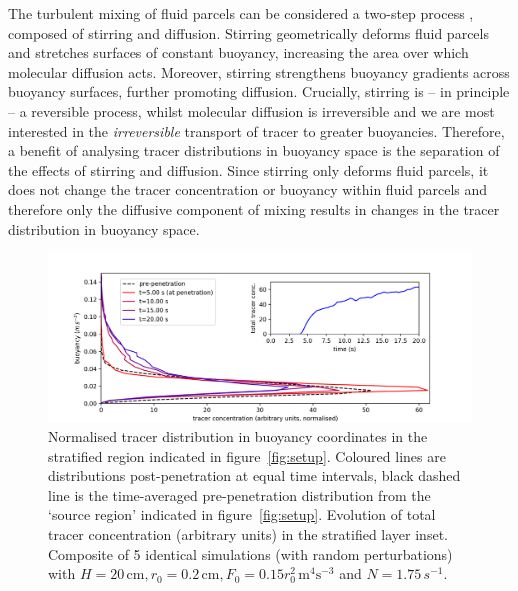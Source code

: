 \documentclass[a4paper]{article}
\begin{document}
The turbulent mixing of fluid parcels can be considered a two-step process \citep{wykes2014}, composed of
stirring and diffusion. Stirring geometrically deforms fluid parcels and stretches surfaces of
constant buoyancy, increasing the area over which molecular diffusion acts. Moreover, stirring strengthens
buoyancy gradients across buoyancy surfaces, further promoting diffusion. Crucially, stirring is -- in
principle -- a reversible process, whilst molecular diffusion is irreversible and we are most interested in
the \emph{irreversible} transport of tracer to greater buoyancies.  Therefore, a benefit of analysing tracer
distributions in buoyancy space is the separation of the effects of stirring and diffusion. Since stirring
only deforms fluid parcels, it does not change the tracer concentration or buoyancy within fluid parcels and
therefore only the diffusive component of mixing results in changes in the tracer distribution in buoyancy
space. 
\begin{figure}
	\centering
	\includegraphics[width=.8\textwidth]{tb_dist}
	\caption{Normalised tracer distribution in buoyancy coordinates in the stratified region indicated in
		figure~\ref{fig:setup}. Coloured lines are distributions post-penetration at equal time intervals,
		black dashed line is the time-averaged pre-penetration distribution from the `source region' indicated
		in figure~\ref{fig:setup}. Evolution of total tracer concentration (arbitrary units) in the stratified
		layer inset. Composite of 5 identical simulations (with random perturbations) with $H =
		20\,\mathrm{cm}, r_0 = 0.2 \, \mathrm{cm}, F_0 = 0.15r_0^2 \, \mathrm{m}^4 \mathrm{s}^{-3}$ and $N =
		1.75 \,s^{-1}$.}
	\label{fig:tbdist}
\end{figure}
\end{document}

